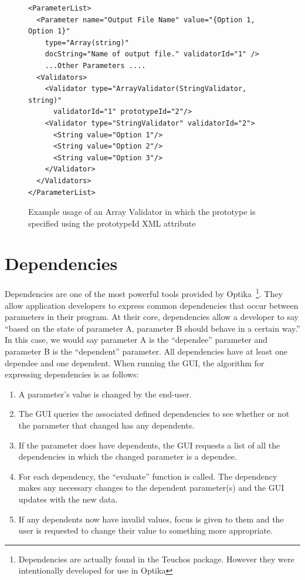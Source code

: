 \begin{figure}
\centering
{\footnotesize
\begin{verbatim}
<ParameterList>
  <Parameter name="Output File Name" value="{Option 1, Option 1}" 
    type="Array(string)" 
    docString="Name of output file." validatorId="1" />
    ...Other Parameters ....
  <Validators>
    <Validator type="ArrayValidator(StringValidator, string)" 
      validatorId="1" prototypeId="2"/>
    <Validator type="StringValidator" validatorId="2">
      <String value="Option 1"/>
      <String value="Option 2"/>
      <String value="Option 3"/>
    </Validator>
  </Validators>
</ParameterList>
\end{verbatim}
}
\caption{Example usage of an Array Validator in which the prototype is specified using the prototypeId XML attribute}
\label{protoAttributeArrayXML}
\end{figure}

\section{Dependencies}
Dependencies are one of the most powerful tools provided by Optika~\footnote{Dependencies are actually found in the Teuchos package. However they were 
intentionally developed for use in Optika}.
They allow application developers to express common dependencies that occur between
parameters in their program. At their core, dependencies allow a developer to say ``based on the state of parameter A, parameter B should
behave in a certain way.'' In this case, we would say parameter A is the ``dependee'' parameter and parameter B is the ``dependent'' parameter.
All dependencies have at least one dependee and one dependent. When running the GUI, the algorithm for expressing dependencies is as follows:
\begin{enumerate}
	\item A parameter's value is changed by the end-user.
	\item The GUI queries the associated defined dependencies to see whether or not the parameter that changed has any dependents.
	\item If the parameter does have dependents, the GUI requests a list of all the dependencies in which the changed
	parameter is a dependee.
	\item For each dependency, the ``evaluate'' function is called. The dependency makes any necessary changes to the dependent parameter(s)
	and the GUI updates with the new data.
	\item If any dependents now have invalid values, focus is given to them and the user is requested to change their value to
	something more appropriate.
\end{enumerate}

